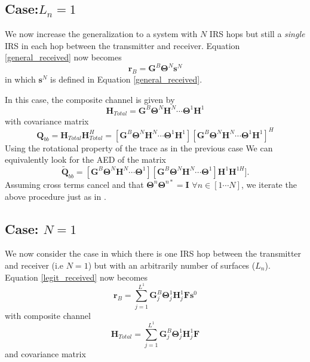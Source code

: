 \documentclass[12pt,a4paper]{report}
\begin{document}
\subsection{Case:$L_n=1$}
We now increase the generalization to a system with $N$ IRS hops but still a \emph{single} IRS in each hop between the transmitter and receiver. 
Equation \ref{general_received} now becomes 
\begin{equation}\label{}
\mathbf{r}_{B} =  \mathbf{G}^{B}\boldsymbol{\Theta}^{N}\mathbf{s}^{N}
\end{equation}
in which $\mathbf{s}^{N}$ is defined in Equation \ref{general_received}.

In this case, the composite channel is given by 
\begin{equation}
\mathbf{H}_{Total} = \mathbf{G}^{B}\boldsymbol{\Theta}^{N}\mathbf{H}^{N} \cdots \boldsymbol{\Theta}^{1}\mathbf{H}^{1}
\end{equation}
with covariance matrix 
\begin{equation}\label{polynomial_terms}
\mathbf{Q}_{bb} = \mathbf{H}_{Total}\mathbf{H}_{Total}^H = [\mathbf{G}^{B}\boldsymbol{\Theta}^{N}\mathbf{H}^{N} \cdots \boldsymbol{\Theta}^{1}\mathbf{H}^{1}][\mathbf{G}^{B}\boldsymbol{\Theta}^{N}\mathbf{H}^{N} \cdots \boldsymbol{\Theta}^{1}\mathbf{H}^{1}]^H
\end{equation}
Using the rotational property of the trace as in the previous case
We can equivalently look for the AED of the matrix 
\begin{equation}
\tilde{\mathbf{Q}}_{bb} = [\mathbf{G}^{B}\boldsymbol{\Theta}^{N}\mathbf{H}^{N} \cdots \boldsymbol{\Theta}^{1}][\mathbf{G}^{B}\boldsymbol{\Theta}^{N}\mathbf{H}^{N} \cdots \boldsymbol{\Theta}^{1}]\mathbf{H}^{1}\mathbf{H}^{1H}].
\end{equation}
Assuming cross terms cancel and that $\boldsymbol{\Theta}^{n}\boldsymbol{\Theta}^{n*} = \mathbf{I}$ $\forall n \in [1\cdots N]$, we iterate the above procedure just as in \cite[Section 4.10]{muller2013applications}.

\subsection{Case: $N=1$}
We now consider the case in which there is one IRS hop between the transmitter and receiver (i.e $N=1$) but with an  arbitrarily number of surfaces ($L_n$). 
Equation \ref{legit_received} now becomes 
\begin{equation}
\mathbf{r}_{B} = \sum_{j = 1}^{L^{1}} \mathbf{G}^{B}_{j}\boldsymbol{\Theta}^{1}_{j}\mathbf{H}^{1}_{j}\mathbf{F}\mathbf{s}^0
\end{equation}
with composite channel
\begin{equation}
\mathbf{H}_{Total} = \sum_{j = 1}^{L^{1}} \mathbf{G}^{B}_{j}\boldsymbol{\Theta}^{1}_{j}\mathbf{H}^{1}_{j}\mathbf{F}
\end{equation}
and covariance matrix
\end{document}

